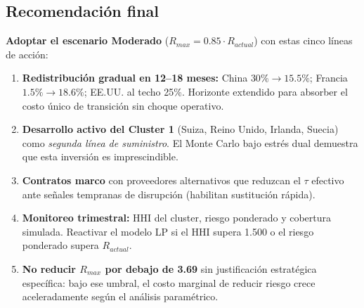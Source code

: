 \documentclass[11pt,a4paper]{article}
\begin{document}
\subsection{Recomendación final}

\begin{recomendacion}
\textbf{Adoptar el escenario Moderado} ($R_{max}=0.85\cdot R_{actual}$) con estas cinco líneas de acción:
\begin{enumerate}[leftmargin=1.3em, itemsep=0.02em, topsep=0pt]
\footnotesize
\item \textbf{Redistribución gradual en 12--18 meses:} China $30\%\to 15.5\%$; Francia $1.5\%\to 18.6\%$; EE.UU. al techo 25\%. Horizonte extendido para absorber el costo único de transición sin choque operativo.
\item \textbf{Desarrollo activo del Cluster 1} (Suiza, Reino Unido, Irlanda, Suecia) como \emph{segunda línea de suministro}. El Monte Carlo bajo estrés dual demuestra que esta inversión es imprescindible.
\item \textbf{Contratos marco} con proveedores alternativos que reduzcan el $\tau$ efectivo ante señales tempranas de disrupción (habilitan sustitución rápida).
\item \textbf{Monitoreo trimestral:} HHI del cluster, riesgo ponderado y cobertura simulada. Reactivar el modelo LP si el HHI supera 1.500 o el riesgo ponderado supera $R_{actual}$.
\item \textbf{No reducir $R_{max}$ por debajo de 3.69} sin justificación estratégica específica: bajo ese umbral, el costo marginal de reducir riesgo crece aceleradamente según el análisis paramétrico.
\end{enumerate}
\end{recomendacion}

\vspace{-0.1cm}
\end{document}
